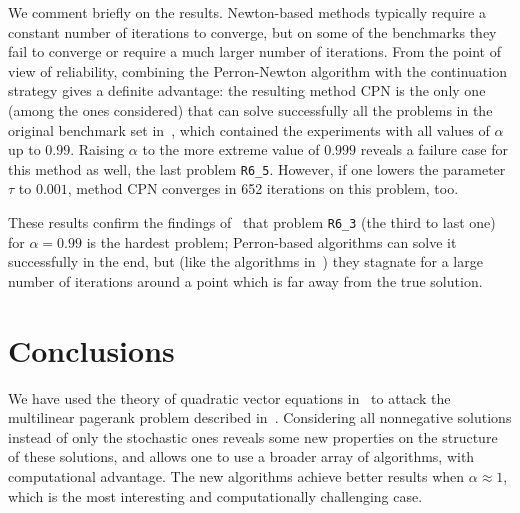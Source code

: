 \documentclass[10pt]{paper}
\begin{document}
We comment briefly on the results. Newton-based methods typically require a constant number of iterations to converge, but on some of the benchmarks they fail to converge or require a much larger number of iterations. From the point of view of reliability, combining the Perron-Newton algorithm with the continuation strategy gives a definite advantage: the resulting method CPN is the only one (among the ones considered) that can solve successfully all the problems in the original benchmark set in~\cite{GleLY15}, which contained the experiments with all values of $\alpha$ up to $0.99$. Raising $\alpha$ to the more extreme value of $0.999$ reveals a failure case for this method as well, the last problem \texttt{R6\_5}. However, if one lowers the parameter $\tau$ to $0.001$, method CPN converges in 652 iterations on this problem, too.

These results confirm the findings of~\cite{GleLY15} that problem \texttt{R6\_3} (the third to last one) for $\alpha=0.99$ is the hardest problem; Perron-based algorithms can solve it successfully in the end, but (like the algorithms in~\cite{GleLY15}) they stagnate for a large number of iterations around a point which is far away from the true solution.

\section{Conclusions} \label{sec:conclusions}
We have used the theory of quadratic vector equations in~\cite{BinMP11,MeiP11,Pol13} to attack the multilinear pagerank problem described in~\cite{GleLY15}. Considering all nonnegative solutions instead of only the stochastic ones reveals some new properties on the structure of these solutions, and allows one to use a broader array of algorithms, with computational advantage. The new algorithms achieve better results when $\alpha \approx 1$, which is the most interesting and computationally challenging case.


\end{document}
